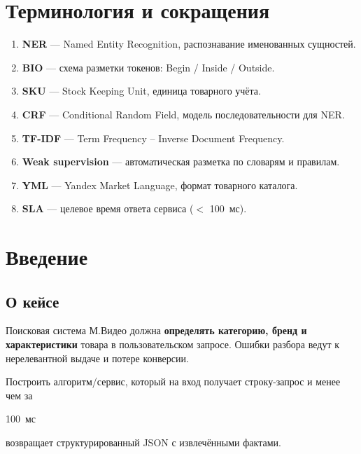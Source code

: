 \documentclass[11pt,a4paper]{article}
\newcommand{\cred}[1]{\textcolor{mvideored}{\textbf{#1}}}
\newcommand{\keyword}[1]{\textcolor{accentblue}{\textbf{#1}}}
\newcommand{\hlred}[1]{\colorbox{pastelred!25}{\textcolor{sectioncolor}{\strut #1}}}
\begin{document}
\newpage
\tableofcontents
\newpage

\section*{Терминология и сокращения}
\begin{infobox}
\begin{enumerate}[leftmargin=*, itemsep=4pt]
    \item \keyword{NER} --- Named Entity Recognition, распознавание именованных сущностей.
    \item \keyword{BIO} --- схема разметки токенов: Begin / Inside / Outside.
    \item \keyword{SKU} --- Stock Keeping Unit, единица товарного учёта.
    \item \keyword{CRF} --- Conditional Random Field, модель последовательности для NER.
    \item \keyword{TF-IDF} --- Term Frequency -- Inverse Document Frequency.
    \item \keyword{Weak supervision} --- автоматическая разметка по словарям и правилам.
    \item \keyword{YML} --- Yandex Market Language, формат товарного каталога.
    \item \keyword{SLA} --- целевое время ответа сервиса ($<$ 100~мс).
\end{enumerate}
\end{infobox}

\newpage

\section{Введение}

\subsection{О кейсе}

Поисковая система М.Видео должна \cred{определять категорию, бренд и характеристики} товара в пользовательском запросе. Ошибки разбора ведут к нерелевантной выдаче и потере конверсии.

\begin{goalbox}
Построить алгоритм/сервис, который на вход получает строку-запрос и менее чем за \hlred{100~мс} возвращает структурированный JSON с извлечёнными фактами.
\end{goalbox}
\end{document}
